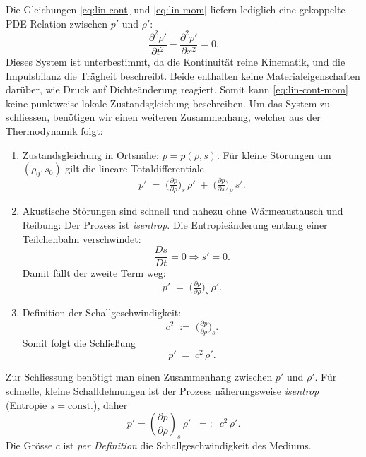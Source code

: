 Die Gleichungen \eqref{eq:lin-cont} und \eqref{eq:lin-mom}
liefern lediglich eine gekoppelte PDE-Relation zwischen $p'$ und $\rho'$:
\begin{equation}
    \frac{\partial^2 \rho'}{\partial t^2} - \frac{\partial^2 p'}{\partial x^2} = 0.
    \label{eq:lin-cont-mom}
\end{equation}
Dieses System ist unterbestimmt, da die Kontinuität reine Kinematik, und
die Impulsbilanz die Trägheit beschreibt. Beide enthalten keine
Materialeigenschaften darüber, wie Druck auf Dichteänderung reagiert.
Somit kann \eqref{eq:lin-cont-mom} keine punktweise lokale Zustandsgleichung beschreiben.
Um das System zu schliessen, benötigen wir einen weiteren Zusammenhang,
welcher aus der Thermodynamik folgt:

\begin{enumerate}
\item Zustandsgleichung in Ortsnähe: $p=p(\rho,s)$.
      Für kleine Störungen um $(\rho_0,s_0)$ gilt die lineare Totaldifferentiale
      \[
        p' \;=\; \Big(\tfrac{\partial p}{\partial \rho}\Big)_{s}\,\rho'
             \;+\; \Big(\tfrac{\partial p}{\partial s}\Big)_{\rho}\,s'.
      \]
\item Akustische Störungen sind schnell und nahezu ohne Wärmeaustausch
      und Reibung: Der Prozess ist \emph{isentrop}.
      Die Entropieänderung entlang einer Teilchenbahn verschwindet:
      \[
        \displaystyle \frac{Ds}{Dt}=0
        \Rightarrow s'=0.
      \]
      Damit fällt der zweite Term weg:
      \[
        p' \;=\; \Big(\tfrac{\partial p}{\partial \rho}\Big)_{s}\,\rho'.
      \]
\item Definition der Schallgeschwindigkeit:
      \[
        c^2 \;:=\; \Big(\tfrac{\partial p}{\partial \rho}\Big)_{s}.
      \]
      Somit folgt die Schließung
      \[
        p' \;=\; c^2\,\rho'.
      \]
\end{enumerate}

Zur Schliessung benötigt man einen Zusammenhang zwischen $p'$ und $\rho'$.
Für schnelle, kleine Schalldehnungen ist der Prozess näherungsweise
\emph{isentrop} (Entropie $s=\mathrm{const.}$), daher
\begin{equation}
    p'= \left(\frac{\partial p}{\partial \rho}\right)_{s}\,\rho' \;\;=: \;\; c^2\,\rho'.
    \label{eq:closure}
\end{equation}
Die Grösse $c$ ist \emph{per Definition} die Schallgeschwindigkeit des Mediums.

